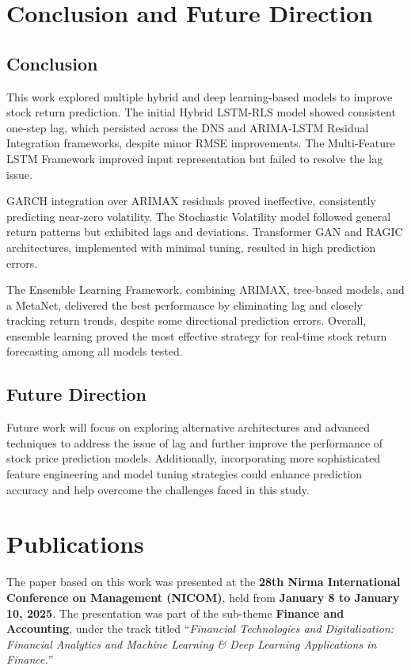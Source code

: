 \chapter{Conclusion and Future Direction}

\section{Conclusion}
This work explored multiple hybrid and deep learning-based models to improve stock return prediction. The initial Hybrid LSTM-RLS model showed consistent one-step lag, which persisted across the DNS and ARIMA-LSTM Residual Integration frameworks, despite minor RMSE improvements. The Multi-Feature LSTM Framework improved input representation but failed to resolve the lag issue.

GARCH integration over ARIMAX residuals proved ineffective, consistently predicting near-zero volatility. The Stochastic Volatility model followed general return patterns but exhibited lags and deviations. Transformer GAN and RAGIC architectures, implemented with minimal tuning, resulted in high prediction errors.

The Ensemble Learning Framework, combining ARIMAX, tree-based models, and a MetaNet, delivered the best performance by eliminating lag and closely tracking return trends, despite some directional prediction errors. Overall, ensemble learning proved the most effective strategy for real-time stock return forecasting among all models tested.

\section{Future Direction}
Future work will focus on exploring alternative architectures and advanced techniques to address the issue of lag and further improve the performance of stock price prediction models. Additionally, incorporating more sophisticated feature engineering and model tuning strategies could enhance prediction accuracy and help overcome the challenges faced in this study.

\chapter{Publications}
The paper based on this work was presented at the \textbf{28th Nirma International Conference on Management (NICOM)}, held from \textbf{January 8 to January 10, 2025}. The presentation was part of the sub-theme \textbf{Finance and Accounting}, under the track titled “\textit{Financial Technologies and Digitalization: Financial Analytics and Machine Learning \& Deep Learning Applications in Finance.}”

